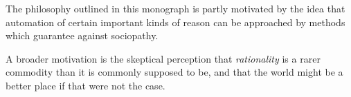 The philosophy outlined in this monograph is partly motivated by the idea that automation of certain important kinds of reason can be approached by methods which guarantee against sociopathy.

A broader motivation is the skeptical perception that \emph{rationality} is a rarer commodity than it is commonly supposed to be, and that the world might be a better place if that were not the case.

\mainmatter
